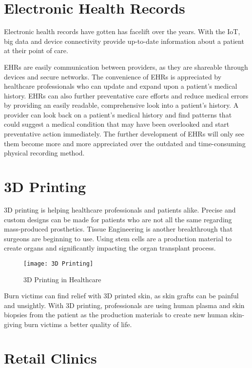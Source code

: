 \documentclass[12pt]{article}
\begin{document}
\section{Electronic Health Records}

Electronic health records have gotten has facelift over the years. With the IoT, big data and device connectivity provide up-to-date information about a patient at their point of care.

EHRs are easily communication between providers, as they are shareable through devices and secure networks. The convenience of EHRs is appreciated by healthcare professionals who can update and expand upon a patient's medical history. EHRs can also further preventative care efforts and reduce medical errors by providing an easily readable, comprehensive look into a patient's history. A provider can look back on a patient's medical history and find patterns that could suggest a medical condition that may have been overlooked and start preventative action immediately. The further development of EHRs will only see them become more and more appreciated over the outdated and time-consuming physical recording method.

\section{3D Printing}

3D printing is helping healthcare professionals and patients alike. Precise and custom designs can be made for patients who are not all the same regarding mass-produced prosthetics. Tissue Engineering is another breakthrough that surgeons are beginning to use. Using stem cells are a production material to create organs and significantly impacting the organ transplant process.

\begin{figure}[h]
\centering
\texttt{[image: 3D Printing]}
\caption{3D Printing in Healthcare}
\end{figure}

 Burn victims can find relief with 3D printed skin, as skin grafts can be painful and unsightly. With 3D printing, professionals are using human plasma and skin biopsies from the patient as the production materials to create new human skin-giving burn victims a better quality of life.

\section{Retail Clinics}
\end{document}
